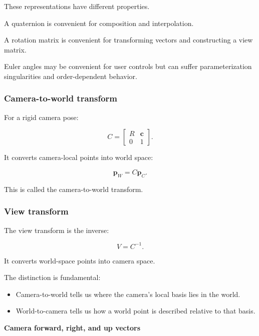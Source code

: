 These representations have different properties.

A quaternion is convenient for composition and interpolation.

A rotation matrix is convenient for transforming vectors and constructing a view matrix.

Euler angles may be convenient for user controls but can suffer parameterization singularities and order-dependent behavior.

\subsubsection{Camera-to-world transform}\label{02-foundations-ii-ch032-camera-to-world-transform}

\hypertarget{02-foundations-ii-ch032-camera-to-world-transform}{}

For a rigid camera pose:

\[
 \boxed{ C= \begin{bmatrix} R&\mathbf c\\ 0&1 \end{bmatrix} }.
\]

It converts camera-local points into world space:

\[
 \mathbf p_W=C\mathbf p_C.
\]

This is called the camera-to-world transform.

\subsubsection{View transform}\label{02-foundations-ii-ch032-view-transform}

\hypertarget{02-foundations-ii-ch032-view-transform}{}

The view transform is the inverse:

\[
 \boxed{V=C^{-1}}.
\]

It converts world-space points into camera space.

The distinction is fundamental:

\begin{itemize}
\tightlist
\item
  Camera-to-world tells us where the camera's local basis lies in the world.
\item
  World-to-camera tells us how a world point is described relative to that basis.
\end{itemize}

\textbf{Camera forward, right, and up vectors}

